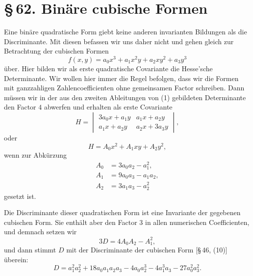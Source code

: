 \documentclass[11pt]{article}
\providecommand{\sect}[2]{\section*{\S\,#1. #2}}
\begin{document}
\sect{62}{Binäre cubische Formen}

Eine binäre quadratische Form giebt keine anderen invarianten Bildungen als die Discriminante. Mit diesen befassen wir uns daher nicht und gehen gleich zur Betrachtung der cubischen Formen
\begin{equation}
 f(x,y)=a_0x^3+a_1x^2y+a_2xy^2+a_3y^3
\tag{1}
\end{equation}
über. Hier bilden wir als erste quadratische Covariante die Hesse'sche Determinante. Wir wollen hier immer die Regel befolgen, dass wir die Formen mit ganzzahligen Zahlencoefficienten ohne gemeinsamen Factor schreiben. Dann müssen wir in der aus den zweiten Ableitungen von (1) gebildeten Determinante den Factor $4$ abwerfen und erhalten als erste Covariante
\[
 H=\begin{vmatrix}
 3a_0x+a_1y & a_1x+a_2y\\
 a_1x+a_2y & a_2x+3a_3y
 \end{vmatrix},
\]
oder
\begin{equation}
 H=A_0x^2+A_1xy+A_2y^2,
\tag{2}
\end{equation}
wenn zur Abkürzung
\begin{equation}
\begin{aligned}
 A_0&=3a_0a_2-a_1^2,\\
 A_1&=9a_0a_3-a_1a_2,\\
 A_2&=3a_1a_3-a_2^2
\end{aligned}
\tag{3}
\end{equation}
gesetzt ist.

Die Discriminante dieser quadratischen Form ist eine Invariante der gegebenen cubischen Form. Sie enthält aber den Factor $3$ in allen numerischen Coefficienten, und demnach setzen wir
\begin{equation}
 3D=4A_0A_2-A_1^2,
\tag{4}
\end{equation}
und dann stimmt $D$ mit der Discriminante der cubischen Form [\S\,46, (10)] überein:
\begin{equation}
 D=a_1^2a_2^2+18a_0a_1a_2a_3-4a_0a_2^3-4a_1^3a_3-27a_0^2a_3^2.
\tag{5}
\end{equation}
\end{document}
